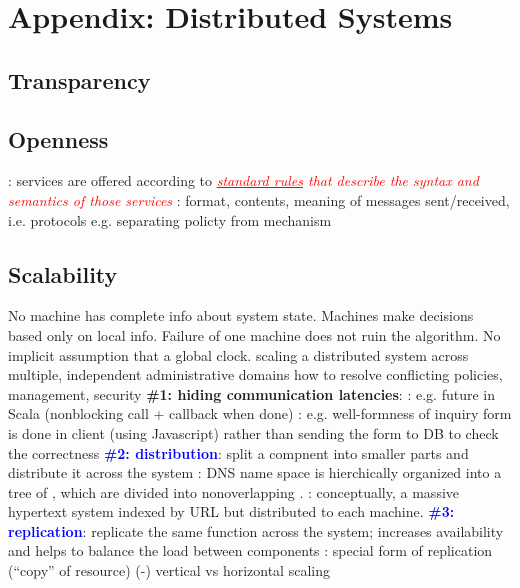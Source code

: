 \documentclass{note}
\begin{document}
\section{Appendix: Distributed Systems}
\subsection{Transparency}
  \bit
  \eit
\subsection{Openness}
  \bit
  \w {}: services are offered
  according to \textcolor{red}{\textit{\underline{standard rules} that describe
      the syntax and semantics of those services}}
     \bit
     \w {}: format, contents, meaning of messages
     sent/received, 
     i.e. \textcolor{blue2}{protocols}
     \eit
  \w e.g. 
  \w \textcolor{blue2}{separating policty from mechanism}
  \eit
\subsection{Scalability}
\bit
\w {}
    \ben
    \w \textcolor{blue2}{No machine has complete info about system
      state.} 
    \w \textcolor{blue2}{Machines make decisions based only on local info.}
    \w \textcolor{blue2}{Failure of one machine does not ruin the algorithm.}
    \w \textcolor{blue2}{No implicit assumption that a global clock.}
    \een
\w scaling a distributed system across multiple, independent
  administrative domains
\w how to resolve conflicting policies, management, security
\w \bb{\textcolor{red2}{SCALING TECHNIQUES}} 
  \bit
  \w \textcolor{blue2}{\bf{}\#1: hiding communication latencies}:
    \bit
    \w {}: e.g. future in Scala (nonblocking call +
    callback when done)
    \w {}: e.g. well-formness of inquiry
    form is done in client (using Javascript) rather than sending the form to
    DB to check the correctness
    \eit
  \w \textcolor{blue}{\bf{}\#2: distribution}: split a compnent into smaller
  parts and distribute it across the system
    \bit
    \w {}: DNS name space is hierchically organized into a tree of
    , which are divided into nonoverlapping .
    \w {}: conceptually, a massive hypertext system indexed by
    URL but distributed to each machine.
    \eit
  \w \textcolor{blue}{\bf{}\#3: replication}: replicate the same function
  across the system; increases availability and helps to balance the load
  between components
    \bit
    \w {}: special form of replication (``copy'' of resource)
    \w (-) 
    \eit
  \eit
\w vertical vs horizontal scaling
\eit
\end{document}
